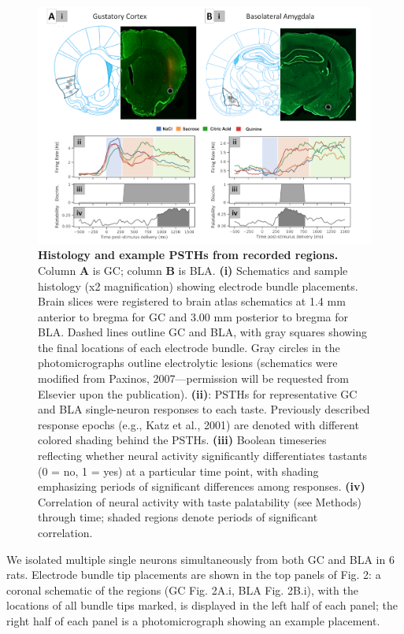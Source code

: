 \begin{refsection}
\begin{figure}
\includegraphics[width=\linewidth]{mahmood_22_figures/fig2-0.png}
\caption{\textbf{Histology and example PSTHs from recorded regions.} Column \textbf{A} is GC; column \textbf{B} is BLA. \textbf{(i)} Schematics and sample histology (x2 magnification) showing electrode bundle placements. Brain slices were registered to brain atlas schematics at 1.4 mm anterior to bregma for GC and 3.00 mm posterior to bregma for BLA. Dashed lines outline GC and BLA, with gray squares showing the final locations of each electrode bundle. Gray circles in the photomicrographs outline electrolytic lesions (schematics were modified from Paxinos, 2007—permission will be requested from Elsevier upon the publication).  \textbf{(ii)}: PSTHs for representative GC and BLA single-neuron responses to each taste. Previously described response epochs (e.g., Katz et al., 2001) are denoted with different colored shading behind the PSTHs. \textbf{(iii)}  Boolean timeseries reflecting whether neural activity significantly differentiates tastants (0 = no, 1 = yes) at a particular time point, with shading emphasizing periods of significant differences among responses. \textbf{(iv)} Correlation of neural activity with taste palatability (see Methods) through time; shaded regions denote periods of significant correlation.}
\label{fig:wrapfig}
\end{figure}

We isolated multiple single neurons simultaneously from both GC and BLA in 6 rats. Electrode bundle tip placements are shown in the top panels of Fig. 2: a coronal schematic of the regions (GC Fig. 2A.i, BLA Fig. 2B.i), with the locations of all bundle tips marked, is displayed in the left half of each panel; the right half of each panel is a photomicrograph showing an example placement. 


\end{refsection}
